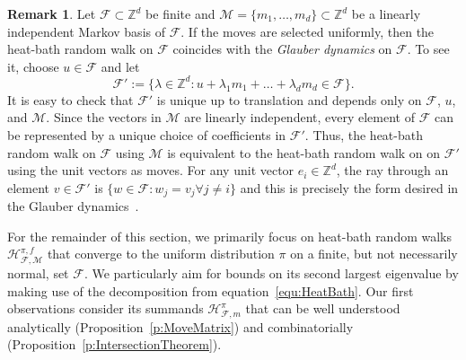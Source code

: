 \documentclass[11pt]{amsart}
\theoremstyle{definition}
\newtheorem{remark}[thm]{Remark}
\numberwithin{equation}{section}
\newcommand{\ring}[1]{\ensuremath{\mathbb{#1}}}
\renewcommand{\>}{\rangle}
\newcommand{\<}{\langle}
\newcommand{\0}{\mathbf{0}}
\newcommand{\1}{\mathbf{1}}
\newcommand{\2}{\mathbf{2}}
\newcommand\ZZ{\ring{Z}}
\newcommand\cF{{\mathcal F}}
\newcommand\cM{{\mathcal M}}
\newcommand{\heatbath}[4]{\mathcal{H}^{#1,#2}_{#3,#4}}
\newcommand{\heatbathmove}[3]{\mathcal{H}^{#1}_{#2,#3}}
\begin{document}
\begin{remark}\label{r:GlauberDynamics}
Let $\cF\subset\ZZ^d$ be finite and $\cM=\{m_1,\dots,m_d\}\subset\ZZ^d$ be a
linearly independent Markov basis of $\cF$. If the moves are selected
uniformly, then the heat-bath random walk on $\cF$ coincides with the
\emph{Glauber dynamics} on $\cF$. To see it, choose $u\in\cF$ and let
\begin{equation*}
\cF':=\{\lambda\in\ZZ^d: u+\lambda_1m_1+\dots+\lambda_dm_d\in\cF\}.
\end{equation*}
It is easy to check that $\cF'$ is unique up to translation and
depends only on $\cF$, $u$, and $\cM$. Since the vectors in $\cM$ are linearly
independent, every element of $\cF$ can be represented by a
unique choice of coefficients in $\cF'$. Thus, the heat-bath random walk
on $\cF$ using $\cM$ is equivalent to the heat-bath random walk on
on $\cF'$ using the unit vectors as moves. For any unit vector
$e_i\in\ZZ^d$, the ray through an element $v\in\cF'$ is $\{w\in\cF:
w_j=v_j \forall j\neq i\}$ and this is precisely the form desired in
the Glauber dynamics~\cite[Section~3.3.2]{levin2008}.
\end{remark}

For the remainder of this section, we primarily focus on heat-bath
random walks $\heatbath{\pi}{f}{\cF}{\cM}$ that converge to the
uniform distribution $\pi$ on a finite, but not necessarily normal, set $\cF$. We particularly
aim for bounds on its second largest eigenvalue by
making use of the decomposition from equation~\ref{equ:HeatBath}. Our
first observations consider its summands $\heatbathmove{\pi}{\cF}{m}$
that can be well understood analytically
(Proposition~\ref{p:MoveMatrix}) and combinatorially
(Proposition~\ref{p:IntersectionTheorem}). 
\end{document}
